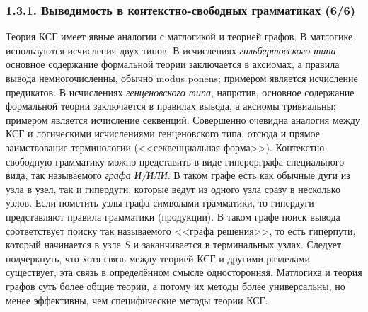 \documentclass[mathserif,12pt,aspectratio=169]{beamer}
\def\emразделенной{\em разделенной}
\renewcommand{\index}[1]{}
\def\em#1{\it\color{blue}#1}
\def\odmkey#1#2{{\it\color{red} #1}\index{#2}}
\begin{document}
\begin{frame}
\frametitle{1.3.1. Выводимость в контекстно-свободных грамматиках (6/6)}

\begin{digress}
Теория КСГ имеет явные аналогии с матлогикой и теорией графов.
В матлогике используются исчисления двух типов.
В исчислениях {\em гильбертовского типа} основное содержание формальной 
теории заключается в аксиомах, а правила вывода немногочисленны, обычно modus ponens;
примером является исчисление предикатов.
В исчислениях {\em генценовского типа}, напротив, основное содержание формальной 
теории заключается в правилах вывода, а аксиомы тривиальны; примером является исчисление секвенций.
Совершенно очевидна аналогия между КСГ и логическими исчислениями генценовского типа,
отсюда и прямое заимствование терминологии (<<секвенциальная форма>>).
Контекстно-свободную грамматику можно представить в виде гиперорграфа специального
вида, так называемого \odmkey{графа И/ИЛИ}{Граф!И/ИЛИ}. В таком графе
есть как обычные дуги из узла в узел, так и гипердуги, которые ведут из одного узла сразу в несколько узлов.
Если пометить узлы графа символами грамматики, то гипердуги представляют правила грамматики (продукции). В таком графе поиск вывода соответствует поиску так 
называемого <<графа решения>>, то есть гиперпути, который начинается в узле
$S$ и заканчивается в терминальных узлах. 
Следует подчеркнуть, что хотя связь между теорией КСГ и другими разделами существует,
эта связь в определённом смысле односторонняя. Матлогика и теория графов суть более общие теории, а потому их методы более универсальны,
но менее эффективны, чем специфические методы теории КСГ.    
\end{digress}
\end{frame}
\end{document}
